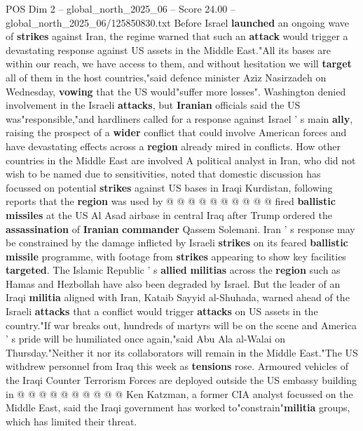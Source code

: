 \begin{textsample}{POS Dim 2 – global\_north\_2025\_06 – Score 24.00 – global\_north\_2025\_06/125850830.txt}  \label{ex:f2_pos_353}
Before Israel \textbf{launched} an ongoing wave of \textbf{strikes} against Iran, the regime warned that such an \textbf{attack} would trigger a devastating response against US assets in the Middle East."All its bases are within our reach, we have access to them, and without hesitation we will \textbf{target} all of them in the host countries,"said defence minister Aziz Nasirzadeh on Wednesday, \textbf{vowing} that the US would"suffer more losses".
Washington denied involvement in the Israeli \textbf{attacks}, but \textbf{Iranian} officials said the US was"responsible,"and hardliners called for a response against Israel ' s main \textbf{ally}, raising the prospect of a \textbf{wider} conflict that could involve American forces and have devastating effects across a \textbf{region} already mired in conflicts.
How other countries in the Middle East are involved A political analyst in Iran, who did not wish to be named due to sensitivities, noted that domestic discussion has focussed on potential \textbf{strikes} against US bases in Iraqi Kurdistan, following reports that the \textbf{region} was used by @ @ @ @ @ @ @ @ @ @ fired \textbf{ballistic} \textbf{missiles} at the US Al Asad airbase in central Iraq after Trump ordered the \textbf{assassination} of \textbf{Iranian} \textbf{commander} Qassem Solemani.
Iran ' s response may be constrained by the damage inflicted by Israeli \textbf{strikes} on its feared \textbf{ballistic} \textbf{missile} programme, with footage from \textbf{strikes} appearing to show key facilities \textbf{targeted}.
The Islamic Republic ' s \textbf{allied} \textbf{militias} across the \textbf{region} such as Hamas and Hezbollah have also been degraded by Israel.
But the leader of an Iraqi \textbf{militia} aligned with Iran, Kataib Sayyid al-Shuhada, warned ahead of the Israeli \textbf{attacks} that a conflict would trigger \textbf{attacks} on US assets in the country."If war breaks out, hundreds of martyrs will be on the scene and America ' s pride will be humiliated once again,"said Abu Ala al-Walai on Thursday."Neither it nor its collaborators will remain in the Middle East."The US withdrew personnel from Iraq this week as \textbf{tensions} rose.
Armoured vehicles of the Iraqi Counter Terrorism Forces are deployed outside the US embassy building in @ @ @ @ @ @ @ @ @ @ Ken Katzman, a former CIA analyst focussed on the Middle East, said the Iraqi government has worked to"constrain"\textbf{militia} groups, which has limited their threat.

\end{textsample}
